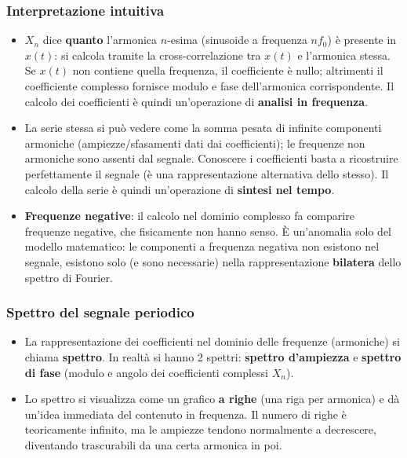 \documentclass[12pt, a4paper]{article}
\begin{document}
\subsubsection{Interpretazione intuitiva}
\begin{itemize}
    \item $X_n$ dice \textbf{quanto} l'armonica $n$-esima (sinusoide a frequenza $nf_0$) è presente in $x(t)$: si calcola tramite la cross-correlazione tra $x(t)$ e l'armonica stessa. Se $x(t)$ non contiene quella frequenza, il coefficiente è nullo; altrimenti il coefficiente complesso fornisce modulo e fase dell'armonica corrispondente. Il calcolo dei coefficienti è quindi un'operazione di \textbf{analisi in frequenza}.
    \item La serie stessa si può vedere come la somma pesata di infinite componenti armoniche (ampiezze/sfasamenti dati dai coefficienti); le frequenze non armoniche sono assenti dal segnale. Conoscere i coefficienti basta a ricostruire perfettamente il segnale (è una rappresentazione alternativa dello stesso). Il calcolo della serie è quindi un'operazione di \textbf{sintesi nel tempo}.
    \item[] \textbf{Frequenze negative}: il calcolo nel dominio complesso fa comparire frequenze negative, che fisicamente non hanno senso. È un'anomalia solo del modello matematico: le componenti a frequenza negativa non esistono nel segnale, esistono solo (e sono necessarie) nella rappresentazione \textbf{bilatera} dello spettro di Fourier.
\end{itemize}

\subsubsection{Spettro del segnale periodico}
\begin{itemize}
    \item La rappresentazione dei coefficienti nel dominio delle frequenze (armoniche) si chiama \textbf{spettro}. In realtà si hanno 2 spettri: \textbf{spettro d'ampiezza} e \textbf{spettro di fase} (modulo e angolo dei coefficienti complessi $X_n$).
    \item Lo spettro si visualizza come un grafico \textbf{a righe} (una riga per armonica) e dà un'idea immediata del contenuto in frequenza. Il numero di righe è teoricamente infinito, ma le ampiezze tendono normalmente a decrescere, diventando trascurabili da una certa armonica in poi.
\end{itemize}
\end{document}
